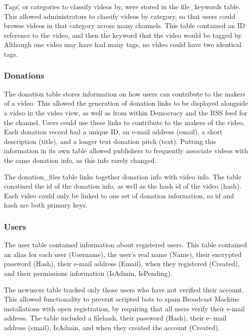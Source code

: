 \documentclass[a4paper,12pt]{report}
\begin{document}
\"Tags\", or categories to classify videos by, were stored in the file\_keywords table. This allowed administrators to classify videos by category, so that users could browse videos in that category across many channels. This table contained an ID reference to the video, and then the keyword that the video would be tagged by. Although one video may have had many tags, no video could have two identical tags.


\subsubsection{Donations}
The donation table stores information on how users can contribute to the makers of a video. This allowed the generation of donation links to be displayed alongside a video in the video view, as well as from within Democracy and the RSS feed for the channel. Users could use these links to contribute to the makers of the video. Each donation record had a unique ID, an e-mail address (email), a short description (title), and a longer text donation pitch (text). Putting this information in its own table allowed publishers to frequently associate videos with the same donation info, as this info rarely changed. 


The donation\_files table links together donation info with video info. The table conatined the id of the donation info, as well as the hash id of the video (hash). Each video could only be linked to one set of donation information, so id and hash are both primary keys.


\subsubsection{Users}
The user table contained information about registered users. This table contained an alias for each user (Username), the user's real name (Name), their encrypted password (Hash), their e-mail address (Email), when they registered (Created), and their permissions information (IsAdmin, IsPending). 


The newusers table tracked only those users who have not verified their account. This allowed functionality to prevent scripted bots to spam Broadcast Machine installations with open registration, by requiring that all users verify their e-mail address. The table included a filehash, their password (Hash), their e- mail address (email), IsAdmin, and when they created the account (Created).
\end{document}
